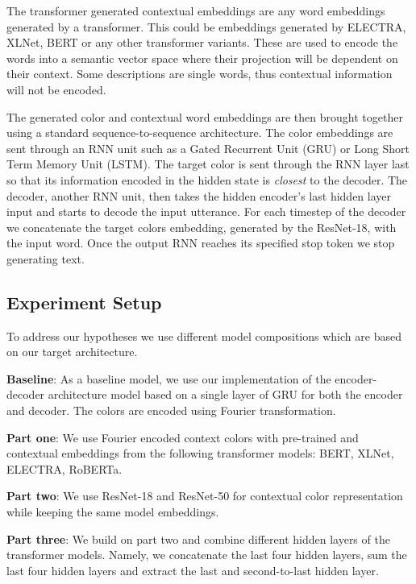 \par
The transformer generated contextual embeddings are any word embeddings generated by a transformer. This could be embeddings generated by ELECTRA, XLNet, BERT or any other transformer variants. These are used to encode the words into a semantic vector space where their projection will be dependent on their context. Some descriptions are single words, thus contextual information will not be encoded.

\par
The generated color and contextual word embeddings are then brought together using a standard sequence-to-sequence architecture. The color embeddings are sent through an RNN unit such as a Gated Recurrent Unit (GRU) or Long Short Term Memory Unit (LSTM). The target color is sent through the RNN layer last so that its information encoded in the hidden state is \emph{closest} to the decoder. The decoder, another RNN unit, then takes the hidden encoder's last hidden layer input and starts to decode the input utterance. For each timestep of the decoder we concatenate the target colors embedding, generated by the ResNet-18, with the input word. Once the output RNN reaches its specified stop token we stop generating text.

\subsection{Experiment Setup}
To address our hypotheses we use different model compositions which are based on our target architecture.

\textbf{Baseline}:
As a baseline model, we use our implementation of the encoder-decoder architecture model based on a single layer of GRU for both the encoder and decoder. The colors are encoded using Fourier transformation.

\textbf{Part one}:
We use Fourier encoded context colors with pre-trained and contextual embeddings from the following transformer models: BERT, XLNet, ELECTRA, RoBERTa.

\textbf{Part two}:
We use ResNet-18 and ResNet-50 for contextual color representation while keeping the same model embeddings.

\textbf{Part three}:
We build on part two and combine different hidden layers of the transformer models. Namely, we concatenate the last four hidden layers, sum the last four hidden layers and extract the last and second-to-last hidden layer.
